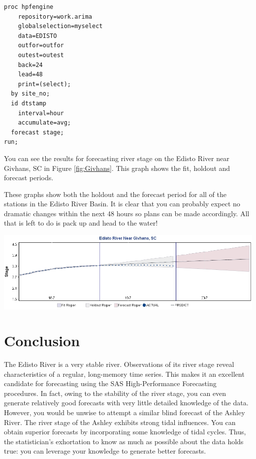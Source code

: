 \documentclass[10pt]{sugconf-ish}
\begin{document}
\small
\begin{verbatim}
proc hpfengine 
    repository=work.arima
    globalselection=myselect
    data=EDISTO
    outfor=outfor
    outest=outest 
    back=24
    lead=48
    print=(select);
  by site_no;
  id dtstamp 
    interval=hour 
    accumulate=avg;
  forecast stage;
run;
\end{verbatim}
\normalsize

You can see the results for forecasting river stage on the Edisto River near Givhans, SC in Figure \ref{fig:Givhans}. This graph shows the fit, holdout and forecast periods.

These graphs show both the holdout and the forecast period for all of the stations in the Edisto River Basin. It is clear that you can probably expect no dramatic changes within the next 48 hours so plans can be made accordingly. All that is left to do is pack up and head to the water! 

\begin{minipage}{\linewidth} 
\centering
\includegraphics[width=6in,keepaspectratio]{givhans.jpg} 
\label{fig:Givhans}
\end{minipage}




\section{Conclusion}
The Edisto River is a very stable river. Observations of its river stage reveal characteristics of a regular, long-memory time series. This makes it an excellent candidate for forecasting using the SAS High-Performance Forecasting procedures. In fact, owing to the stability of the river stage, you can even generate relatively good forecasts with very little detailed knowledge of the data. However, you would be unwise to attempt a similar blind forecast of the Ashley River. The river stage of the Ashley exhibits strong tidal influences. You can obtain superior forecasts by incorporating some knowledge of tidal cycles. Thus, the statistician's exhortation to know as much as possible about the data holds true: you can leverage your knowledge to generate better forecasts. 
\end{document}
